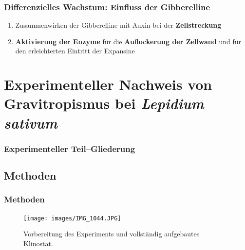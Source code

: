 \documentclass[aspectratio=169
]{beamer}
\begin{document}
\begin{frame}[<+(1)->]
\frametitle{Differenzielles Wachstum: Einfluss der Gibberelline}
\begin{enumerate}
	\item Zusammenwirken der Gibberelline mit Auxin bei der \textbf{Zellstreckung}
	\item \textbf{Aktivierung der Enzyme} für die \textbf{Auflockerung der Zellwand} und für den erleichterten Eintritt der Expansine
\end{enumerate}
\end{frame}

\section{Experimenteller Nachweis von Gravitropismus bei \protect\emph{Lepidium sativum}}
	
\begin{frame}[<+(1)->]
\frametitle{Experimenteller Teil--Gliederung}
		
\tableofcontents[currentsection, sections=2, pausesections, pausesubsections, subsectionstyle=show/show/shaded, subsubsectionstyle=show/show/show/shaded]
		



\end{frame}	
	
	\subsection{Methoden}
	
	\begin{frame}[<+(1)->]
		\frametitle{Methoden}
		\begin{figure}[H]
			\centering 
			\texttt{[image: images/IMG\_1044.JPG]}
			\caption{Vorbereitung des Experiments und vollständig aufgebautes Klinostat.\label{Klinostat2}}
		\end{figure}
		
	\end{frame}
	
\end{document}
